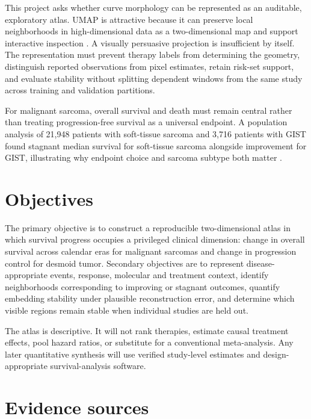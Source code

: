 \documentclass[17pt]{extarticle}
\begin{document}
This project asks whether curve morphology can be represented as an auditable, exploratory atlas. UMAP is attractive because it can preserve local neighborhoods in high-dimensional data as a two-dimensional map and support interactive inspection \citep{mcinnes2018umap}. A visually persuasive projection is insufficient by itself. The representation must prevent therapy labels from determining the geometry, distinguish reported observations from pixel estimates, retain risk-set support, and evaluate stability without splitting dependent windows from the same study across training and validation partitions.

For malignant sarcoma, overall survival and death must remain central rather than treating progression-free survival as a universal endpoint. A population analysis of 21,948 patients with soft-tissue sarcoma and 3,716 patients with GIST found stagnant median survival for soft-tissue sarcoma alongside improvement for GIST, illustrating why endpoint choice and sarcoma subtype both matter \citep{hardy2025sts}.

\section{Objectives}

The primary objective is to construct a reproducible two-dimensional atlas in which survival progress occupies a privileged clinical dimension: change in overall survival across calendar eras for malignant sarcomas and change in progression control for desmoid tumor. Secondary objectives are to represent disease-appropriate events, response, molecular and treatment context, identify neighborhoods corresponding to improving or stagnant outcomes, quantify embedding stability under plausible reconstruction error, and determine which visible regions remain stable when individual studies are held out.

The atlas is descriptive. It will not rank therapies, estimate causal treatment effects, pool hazard ratios, or substitute for a conventional meta-analysis. Any later quantitative synthesis will use verified study-level estimates and design-appropriate survival-analysis software.

\section{Evidence sources}
\end{document}
